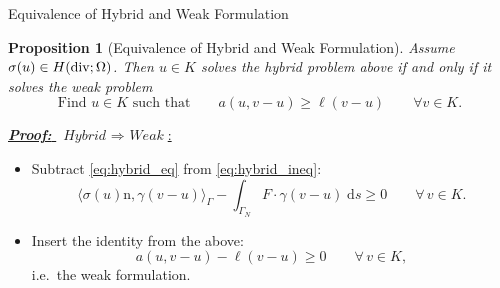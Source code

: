 \documentclass[10pt,aspectratio=169]{beamer}
\newtheorem{proposition}{Proposition}[section]
\def\d{{\mathrm{d}}}
\def\ds{{\d s}}
\newcommand{\diver}{\operatornamewithlimits{div}}
\begin{document}
\begin{frame}{Equivalence of Hybrid and Weak Formulation}
	\begin{proposition}[Equivalence of Hybrid and Weak Formulation]
		Assume $\sigma(u)\in H(\diver;\Omega)$. Then $u\in K$ solves the hybrid problem above if and only if it solves the weak problem
		\begin{equation*}
			\text{Find }u\in K\text{ such that}\qquad a(u,v-u)\ge\ell(v-u)\qquad \forall v\in K.
		\end{equation*}
	\end{proposition}
	\underline{\textbf{\em Proof:} $\ \textit{Hybrid }\Rightarrow\textit{ Weak}$:}
	\begin{itemize}
		\item Subtract \eqref{eq:hybrid_eq} from \eqref{eq:hybrid_ineq}:
		      \begin{equation*}
			      \langle \sigma(u)\mathrm n,\gamma (v-u)\rangle_\Gamma - \int_{\Gamma_N}F\cdot \gamma (v-u)\;\ds \ge 0\qquad\forall\, v\in K.
		      \end{equation*}
		\item Insert the identity from the above:
		      \begin{equation*}
			      a(u,v-u)-\ell(v-u)\ge 0
			      \qquad\forall\,v\in K,
		      \end{equation*}
		      i.e.\ the weak formulation.
	\end{itemize}
\end{frame}
\end{document}

